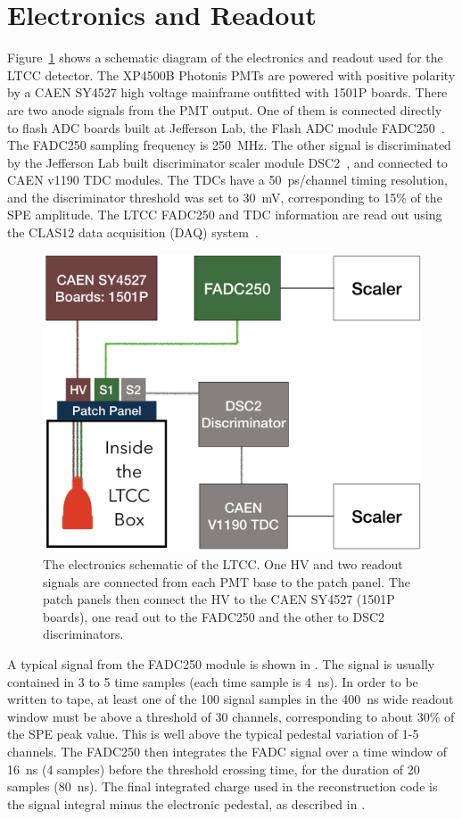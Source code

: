 \section{Electronics and Readout}

Figure~\ref{fig:electronicScheme} shows a schematic diagram of the electronics and readout used for the LTCC
detector. The XP4500B Photonis PMTs are powered with positive polarity by a CAEN SY4527 high voltage
mainframe outfitted with 1501P boards. There are two anode signals from the PMT output. One of them is
connected directly to flash ADC boards built at Jefferson Lab, the Flash ADC module FADC250~\cite{daq-nim}.
The FADC250 sampling frequency is 250~MHz. The other signal is discriminated by the Jefferson Lab built
discriminator scaler module DSC2~\cite{daq-nim}, and connected to CAEN v1190 TDC modules. The TDCs have a
50~ps/channel timing resolution, and the discriminator threshold was set to 30~mV, corresponding to 15\% of the
SPE amplitude. The LTCC FADC250 and TDC information are read out using the CLAS12 data acquisition (DAQ)
system~\cite{daq-nim}.

\begin{figure}
	\centering
	\includegraphics[width=0.99\columnwidth, height=0.6\columnwidth]{img/electronicScheme.png}
	\caption{The electronics schematic of the LTCC. One HV and two readout signals are connected from each PMT
          base to the patch panel. The patch panels then connect the HV to the CAEN SY4527 (1501P boards), one read
          out to the FADC250 and the other to DSC2 discriminators.}
	\label{fig:electronicScheme}
\end{figure}

A typical signal from the FADC250 module is shown in . The signal is usually contained in 3 to 5 time samples
(each time sample is 4~ns). In order to be written to tape, at least one of the 100 signal samples in the 400~ns
wide readout window must be above a threshold of 30 channels, corresponding to about 30\% of the SPE peak value.
This is well above the typical pedestal variation of 1-5 channels. The FADC250 then integrates the FADC signal over
a time window of 16~ns (4 samples) before the threshold crossing time, for the duration of 20 samples (80~ns). The
final integrated charge used in the reconstruction code is the signal integral minus the electronic pedestal, as
described in .

